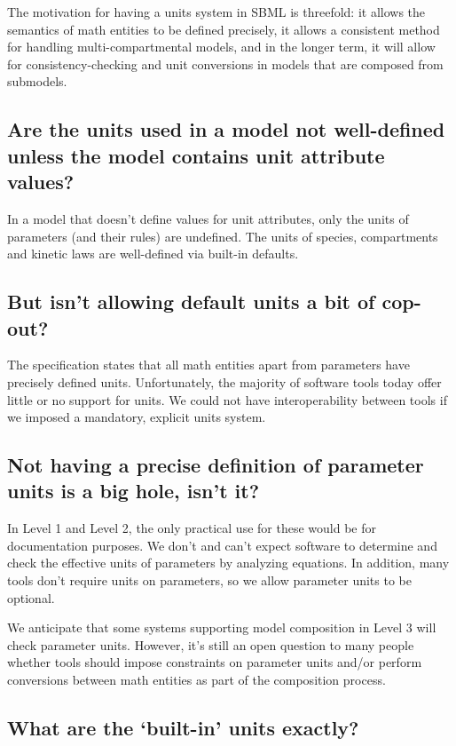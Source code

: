 \documentclass{sbmlfaq}
\begin{document}
The motivation for having a units system in SBML is threefold: it allows
the semantics of math entities to be defined precisely, it allows a
consistent method for handling multi-compartmental models, and in the
longer term, it will allow for consistency-checking and unit conversions in
models that are composed from submodels.


\subsection{Are the units used in a model not well-defined unless the model contains unit attribute values?}

In a model that doesn't define values for unit attributes, only the units of
parameters (and their rules) are undefined.  The units of species,
compartments and kinetic laws are well-defined via built-in defaults.


\subsection{But isn't allowing default units a bit of cop-out?}

The specification states that all math entities apart from parameters have
precisely defined units.  Unfortunately, the majority of software tools
today offer little or no support for units.  We could not have
interoperability between tools if we imposed a mandatory, explicit units
system.


\subsection{Not having a precise definition of parameter units is a big hole, isn't it?}

In Level 1 and Level 2, the only practical use for these would be for documentation purposes.
We don't and can't expect software to determine and check the effective units of parameters by analyzing
equations.  In addition, many tools don't require units on parameters, so we allow parameter
units to be optional.

We anticipate that some systems supporting model composition in Level 3 will check parameter units.
However, it's still an
open question to many people whether tools should impose constraints
on parameter units and/or perform conversions between math entities
as part of the composition process.


\subsection{What are the `built-in' units exactly?}
\end{document}
